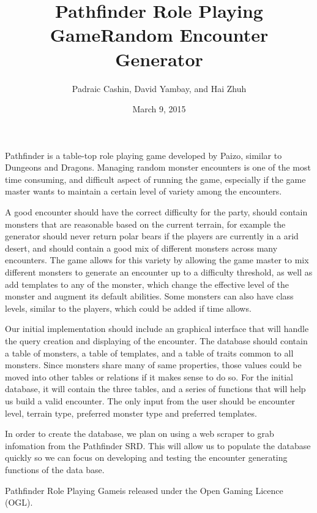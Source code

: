 \documentclass{article}
\title{Pathfinder Role Playing Game\texttrademark Random Encounter Generator}
\author{Padraic Cashin, David Yambay, and Hai Zhuh}
\date{March 9, 2015}
\begin{document}
	\maketitle
	\newpage

	Pathfinder is a table-top role playing game developed by Paizo, similar to 
	Dungeons and Dragons.  Managing random monster encounters is one of the most time
	consuming, and difficult aspect of running the game, especially if the game master
	wants to maintain a certain level of variety among the encounters.  

	A good encounter should have the correct difficulty for the party, should contain 
	monsters that are reasonable based on the current terrain, for example the generator
	should never return polar bears if the players are currently in a arid desert, and 
	should contain a good mix of different monsters across many encounters.  The game 
	allows for this variety by allowing the game master to mix different monsters to 
	generate an encounter up to a difficulty threshold, as well as add templates to any
	of the monster, which change the effective level of the monster and augment its default
	abilities.  Some monsters can also have class levels, similar to the players, which
	could be added if time allows.

	Our initial implementation should include an graphical interface that will handle the 
	query creation and displaying of the encounter.  The database should contain a table 
	of monsters, a table of templates, and a table of traits common to all monsters.  
	Since monsters share many of same properties, those values could be moved into 
	other tables or relations if it makes sense to do so.  For the initial database, 
	it will contain the three tables, and a series of functions that will help us build 
	a valid encounter.  The only input from the user should be encounter level, 
	terrain type, preferred monster type and preferred templates. 

	In order to create the database, we plan on using a web scraper to grab infomation
	from the Pathfinder SRD.  This will allow us to populate the database quickly 
	so we can focus on developing and testing the encounter generating functions of the data
	base.  

	Pathfinder Role Playing Game\texttrademark is released under the Open Gaming Licence (OGL). 
\end{document}
